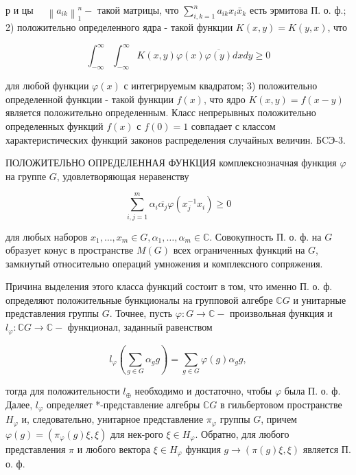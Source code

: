 \documentclass[10pt]{article}
\begin{document}
р и цы $\quad\left\|a_{i k}\right\|_{1}^{n}-$ такой матрицы, что $\sum_{i, k=1}^{n} a_{i k} x_{i} \bar{x}_{k}$ есть эрмитова П. о. ф.; 2) положительно определенного ядра - такой функции $K(x, y)=K(y, x)$, что



\[

\int_{-\infty}^{\infty} \int_{-\infty}^{\infty} K(x, y) \varphi(x) \overline{\varphi(y)} d x d y \geqslant 0

\]



для любой функции $\varphi(x)$ с интегрируемым квадратом; 3) положительно определенной функции - такой функции $f(x)$, что ядро $K(x, y)=f(x-y)$ является положительно определенным. Класс непрерывных положительно определенных функций $f(x)$ с $f(0)=1$ совпадает с классом характеристических функций законов распределения случайных величин. БCЭ-3.



ПОЛОЖИТЕЛЬНО ОПРЕДЕЛЕННАЯ ФУНКЦИЯ комплекснозначная функция $\varphi$ на группе $G$, удовлетворяющая неравенству



\[

\sum_{i, j=1}^{m} \alpha_{i} \overline{\alpha_{j}} \varphi\left(x_{j}^{-1} x_{i}\right) \geqslant 0

\]



для любых наборов $x_{1}, \ldots, x_{m} \in G, \alpha_{1}, \ldots, \alpha_{m} \in \mathbb{C}$. Совокупность П. о. ф. на $G$ образует конус в пространстве $M(G)$ всех ограниченных функций на $G$, замкнутый относительно операций умножения и комплексного сопряжения.



Причина выделения этого класса функций состоит в том, что именно П. о. ф. определяют положительные бункционалы на групповой алгебре $\mathbb{C} G$ и унитарные представления группы $G$. Точнее, пусть $\varphi: G \rightarrow \mathbb{C}-$ произвольная функция и $l_{\varphi}: \mathbb{C} G \rightarrow \mathbb{C}-$ функционал, заданный равенством



\[

l_{\varphi}\left(\sum_{g \in G} \alpha_{g} g\right)=\sum_{g \in G} \varphi(g) \alpha_{g} g,

\]



тогда для положительности $l_{\oplus}$ необходимо и достаточно, чтобы $\varphi$ была П. о. ф. Далее, $l_{\varphi}$ определяет *-представление алгебры $\mathbb{C} G$ в гильбертовом пространстве $H_{\varphi}$ и, следовательно, унитарное представление $\pi_{\varphi}$ группы $G$, причем $\varphi(g)=\left(\pi_{\varphi}(g) \xi, \xi\right)$ для нек-рого $\xi \in H_{\varphi}$. Обратно, для любого представления $\pi$ и любого вектора $\xi \in H_{\varphi}$ функция $g \rightarrow(\pi(g) \xi, \xi)$ является П. о. ф.
\end{document}
